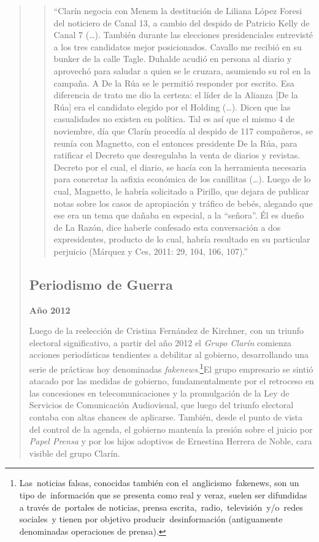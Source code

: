 \begin{quote}
\begin{quote}
	\enquote{Clarín negocia con Menem la destitución de Liliana López Foresi del noticiero de Canal 13, a cambio del despido de Patricio Kelly de Canal 7 (\dots). También durante las elecciones presidenciales entrevisté a los tres candidatos mejor posicionados. Cavallo me recibió en su bunker de la calle Tagle. Duhalde acudió en persona al diario y aprovechó para saludar a quien se le cruzara, asumiendo su rol en la campaña. A De la Rúa se le permitió responder por escrito. Esa diferencia de trato me dio la certeza: el líder de la Alianza {[}De la Rúa{]} era el candidato elegido por el Holding (\dots). Dicen que las casualidades no existen en política. Tal es así que el mismo 4 de noviembre, día que Clarín procedía al despido de 117 compañeros, se reunía con Magnetto, con el entonces presidente De la Rúa, para ratificar el Decreto que desregulaba la venta de diarios y revistas. Decreto por el cual, el diario, se hacía con la herramienta necesaria para concretar la asfixia económica de los canillitas (\dots). Luego de lo cual, Magnetto, le habría solicitado a Pirillo, que dejara de publicar notas sobre los casos de apropiación y tráfico de bebés, alegando que ese era un tema que dañaba en especial, a la ``señora''. Él es dueño de La Razón, dice haberle confesado esta conversación a dos expresidentes, producto de lo cual, habría resultado en su particular perjuicio (Márquez y Ces, 2011: 29, 104, 106, 107).}
\end{quote}


\subsection {Periodismo de Guerra}

\textbf{Año 2012}

Luego de la reelección de Cristina Fernández de Kirchner, con un triunfo electoral significativo, a partir del año 2012 el \emph{Grupo Clarín} comienza acciones periodísticas tendientes a debilitar al gobierno, desarrollando una serie de prácticas hoy denominadas \emph{fakenews}.\footnote{Las noticias falsas, conocidas también con el anglicismo fakenews, son un tipo de información que se presenta como real y veraz, suelen ser difundidas a través de portales de noticias, prensa escrita, radio, televisión y/o redes sociales y tienen por objetivo producir desinformación (antiguamente denominadas operaciones de prensa).}El grupo empresario se sintió atacado por las medidas de gobierno, fundamentalmente por el retroceso en las concesiones en telecomunicaciones y la promulgación de la Ley de Servicios de Comunicación Audiovisual, que luego del triunfo electoral contaba con altas chances de aplicarse. También, desde el punto de vista del control de la agenda, el gobierno mantenía la presión sobre el juicio por \emph{Papel Prensa} y por los hijos adoptivos de Ernestina Herrera de Noble, cara visible del grupo Clarín.


\end{quote}
